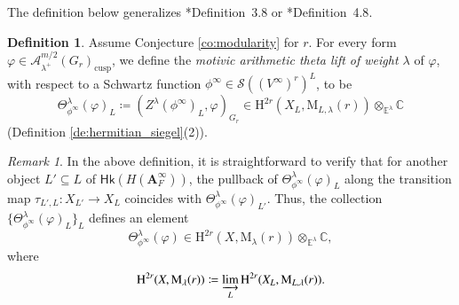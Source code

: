 \documentclass[12pt]{amsart}
\numberwithin{equation}{section}
\theoremstyle{plain}
\theoremstyle{definition}
\newtheorem{definition}[proposition]{Definition}
\theoremstyle{remark}
\newtheorem{remark}[proposition]{Remark}
\renewcommand{\b}[1]{\mathbf{#1}}
\renewcommand{\c}[1]{\mathcal{#1}}
\renewcommand{\d}[1]{\mathbb{#1}}
\renewcommand{\r}[1]{\mathrm{#1}}
\newcommand{\s}[1]{\mathscr{#1}}
\renewcommand{\sf}[1]{\mathsf{#1}}
\renewcommand{\(}{\left(}
\renewcommand{\)}{\right)}
\newcommand{\bA}{\b A}
\newcommand{\cA}{\c A}
\newcommand{\dC}{\d C}
\newcommand{\dE}{\d E}
\newcommand{\rH}{\r H}
\newcommand{\rM}{\r M}
\newcommand{\sS}{\s S}
\newcommand{\cusp}{\r{cusp}}
\newcommand{\Hk}{\sf{Hk}}
\begin{document}
The definition below generalizes \cite{Liu11}*{Definition~3.8} or \cite{LL21}*{Definition~4.8}.

\begin{definition}\label{de:theta_lift}
Assume Conjecture \ref{co:modularity} for $r$. For every form $\varphi\in\cA^{m/2}_{\lambda^+}(G_r)_\cusp$, we define the \emph{motivic arithmetic theta lift of weight $\lambda$} of $\varphi$, with respect to a Schwartz function $\phi^\infty\in\sS((V^\infty)^r)^L$, to be
\[
\Theta_{\phi^\infty}^\lambda(\varphi)_L\coloneqq(Z^\lambda(\phi^\infty)_L,\varphi)_{G_r}
\in \rH^{2r}(X_L,\rM_{L,\lambda}(r))\otimes_{\dE^\lambda}\dC
\]
(Definition \ref{de:hermitian_siegel}(2)).
\end{definition}


\begin{remark}\label{re:theta_lift}
In the above definition, it is straightforward to verify that for another object $L'\subseteq L$ of $\Hk(H(\bA_F^\infty))$, the pullback of $\Theta_{\phi^\infty}^\lambda(\varphi)_L$ along the transition map $\tau_{L',L}\colon X_{L'}\to X_L$ coincides with $\Theta_{\phi^\infty}^\lambda(\varphi)_{L'}$. Thus, the collection $\{\Theta_{\phi^\infty}^\lambda(\varphi)_L\}_L$ defines an element
\[
\Theta_{\phi^\infty}^\lambda(\varphi)\in\rH^{2r}(X,\rM_{\lambda}(r))\otimes_{\dE^\lambda}\dC,
\]
where
\[
\rH^{2r}(X,\rM_{\lambda}(r))\coloneqq\varinjlim_L\rH^{2r}(X_L,\rM_{L,\lambda}(r)).
\]
\end{remark}
\end{document}
